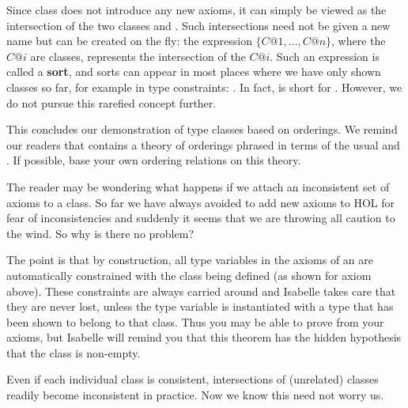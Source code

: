 \begin{isabellebody}
\begin{isamarkuptext}
Since class  does not introduce any new axioms, it can simply
be viewed as the intersection of the two classes  and . Such intersections need not be given a new name but can be created on
the fly: the expression $\{C@1,\dots,C@n\}$, where the $C@i$ are classes,
represents the intersection of the $C@i$. Such an expression is called a
\textbf{sort}, and sorts can appear in most places where we have only shown
classes so far, for example in type constraints: .
In fact,  is short for .
However, we do not pursue this rarefied concept further.

This concludes our demonstration of type classes based on orderings.  We
remind our readers that  contains a theory of
orderings phrased in terms of the usual \isa{{\isasymle}} and \isa{{\isacharless}}.
If possible, base your own ordering relations on this theory.%
\end{isamarkuptext}%
\isamarkuptrue%
%
\isamarkuptrue%
%
\begin{isamarkuptext}%
The reader may be wondering what happens if we
attach an inconsistent set of axioms to a class. So far we have always
avoided to add new axioms to HOL for fear of inconsistencies and suddenly it
seems that we are throwing all caution to the wind. So why is there no
problem?

The point is that by construction, all type variables in the axioms of an
 are automatically constrained with the class being
defined (as shown for axiom  above). These constraints are
always carried around and Isabelle takes care that they are never lost,
unless the type variable is instantiated with a type that has been shown to
belong to that class. Thus you may be able to prove 
from your axioms, but Isabelle will remind you that this
theorem has the hidden hypothesis that the class is non-empty.

Even if each individual class is consistent, intersections of (unrelated)
classes readily become inconsistent in practice. Now we know this need not
worry us.%
\end{isamarkuptext}%
\isamarkuptrue%
\isamarkupfalse%
\end{isabellebody}%
